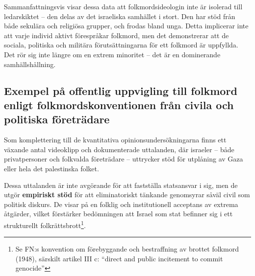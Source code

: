 \documentclass[12pt]{article}
\begin{document}
Sammanfattningsvis visar dessa data att folkmordsideologin inte är isolerad till ledarskiktet – den delas av det israeliska samhället i stort. Den har stöd från både sekulära och religiösa grupper, och frodas bland unga. Detta implicerar inte att varje individ aktivt förespråkar folkmord, men det demonstrerar att de sociala, politiska och militära förutsättningarna för ett folkmord är uppfyllda. Det rör sig inte längre om en extrem minoritet – det är en dominerande samhällshållning.





\subsection{Exempel på offentlig uppvigling till folkmord enligt folkmordskonventionen från civila och politiska företrädare}

Som komplettering till de kvantitativa opinionsundersökningarna finns ett växande antal videoklipp och dokumenterade uttalanden, där israeler – både privatpersoner och folkvalda företrädare – uttrycker stöd för utplåning av Gaza eller hela det palestinska folket.

Dessa uttalanden är inte avgörande för att fastställa statsansvar i sig, men de utgör \textbf{empiriskt stöd} för att eliminatoriskt tänkande genomsyrar såväl civil som politisk diskurs. De visar på en folklig och institutionell acceptans av extrema åtgärder, vilket förstärker bedömningen att Israel som stat befinner sig i ett strukturellt folkrättsbrott\footnote{Se FN:s konvention om förebyggande och bestraffning av brottet folkmord (1948), särskilt artikel III c: “direct and public incitement to commit genocide”}.
\end{document}
